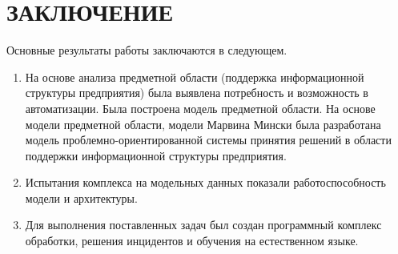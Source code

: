 \chapter*{ЗАКЛЮЧЕНИЕ}						%

Основные результаты работы заключаются в следующем.
\begin{enumerate}
  \item На основе анализа предметной области (поддержка информационной структуры предприятия) была выявлена потребность и возможность в автоматизации. Была построена модель предметной области. На основе модели предметной области, модели Марвина Мински была разработана модель проблемно-ориентированной системы принятия решений в области поддержки информационной структуры предприятия.  
  \item Испытания комплекса на модельных данных показали работоспособность модели и архитектуры.  
  \item Для выполнения поставленных задач был создан программный комплекс обработки, решения инцидентов и обучения на естественном языке. 
\end{enumerate}

